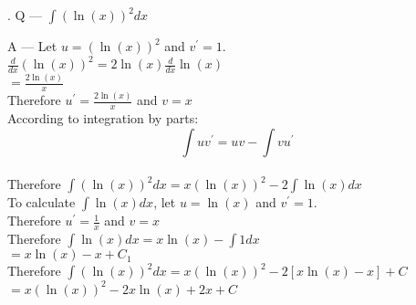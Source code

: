 \documentclass{article}
\newcounter{question}
\begin{document}
\newcommand\Que[1]{%
   \leavevmode\par
   \stepcounter{question}
   \noindent
   \thequestion. Q --- #1\par}

\newcommand\Ans[2][]{%
    \leavevmode\par\noindent
   {A --- \textbf{#1}#2\par}}

\Que{ $ \int{(\ln(x))^2}dx $ }
\Ans
{
Let $ u=(\ln(x))^2 $ and $ v^{\prime}=1 $.\\

$\frac{d}{dx}(\ln(x))^2 = 2\ln(x) \frac{d}{dx}\ln(x) $\\

$ = \frac{2\ln(x)}{x} $\\

Therefore $ u^{\prime}=\frac{2\ln(x)}{x} $ and $ v=x $\\

According to integration by parts:\\
$$\int{uv^{\prime}}=uv-\int{vu^{\prime}}$$\\

Therefore $ \int{(\ln(x))^2}dx = x(\ln(x))^2 - 2\int{\ln(x)} dx $\\

To calculate $ \int{\ln(x)} dx $, let $ u=\ln(x) $ and $ v^{\prime}=1 $.\\

Therefore $ u^{\prime}=\frac{1}{x} $ and $ v=x $\\

Therefore $ \int{\ln(x)} dx = x\ln(x) - \int{1} dx$\\

$ = x\ln(x) - x + C_1 $\\

Therefore $ \int{(\ln(x))^2}dx = x(\ln(x))^2 - 2[x\ln(x) - x] + C $\\

$ = x(\ln(x))^2 - 2x\ln(x) + 2x + C $\\

}
\end{document}
